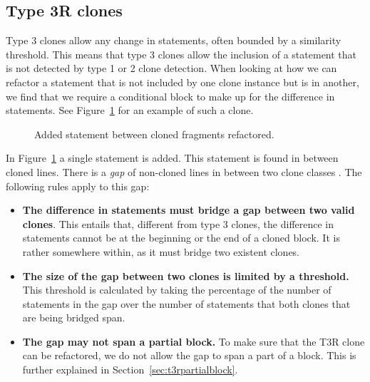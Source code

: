 \subsection{Type 3R clones}\label{sec:type3r}
Type 3 clones allow any change in statements, often bounded by a similarity threshold. This means that type 3 clones allow the inclusion of a statement that is not detected by type 1 or 2 clone detection. When looking at how we can refactor a statement that is not included by one clone instance but is in another, we find that we require a conditional block to make up for the difference in statements. See Figure~\ref{fig:type3} for an example of such a clone.

\begin{figure}[H]
\begin{parcolumns}{2}
\end{parcolumns}
\caption{Added statement between cloned fragments refactored.}
\label{fig:type3}
\end{figure}

In Figure~\ref{fig:type3} a single statement is added. This statement is found in between cloned lines. There is a \textit{gap} of non-cloned lines in between two clone classes \cite{ueda2002detection}. The following rules apply to this gap:

\begin{itemize}
  \item \textbf{The difference in statements must bridge a gap between two valid clones}. This entails that, different from type 3 clones, the difference in statements cannot be at the beginning or the end of a cloned block. It is rather somewhere within, as it must bridge two existent clones.
  \item \textbf{The size of the gap between two clones is limited by a threshold.} This threshold is calculated by taking the percentage of the number of statements in the gap over the number of statements that both clones that are being bridged span.
  \item \textbf{The gap may not span a partial block.} To make sure that the T3R clone can be refactored, we do not allow the gap to span a part of a block. This is further explained in Section~\ref{sec:t3rpartialblock}.
\end{itemize}

